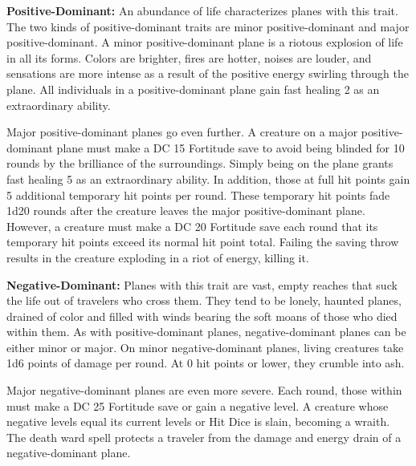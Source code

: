 \textbf{Positive-Dominant:} An abundance of life characterizes planes with this trait. The two kinds of positive-dominant traits are minor positive-dominant and major positive-dominant. A minor positive-dominant plane is a riotous explosion of life in all its forms. Colors are brighter, fires are hotter, noises are louder, and sensations are more intense as a result of the positive energy swirling through the plane. All individuals in a positive-dominant plane gain fast healing 2 as an extraordinary ability.

Major positive-dominant planes go even further. A creature on a major positive-dominant plane must make a DC 15 Fortitude save to avoid being blinded for 10 rounds by the brilliance of the surroundings. Simply being on the plane grants fast healing 5 as an extraordinary ability. In addition, those at full hit points gain 5 additional temporary hit points per round. These temporary hit points fade 1d20 rounds after the creature leaves the major positive-dominant plane. However, a creature must make a DC 20 Fortitude save each round that its temporary hit points exceed its normal hit point total. Failing the saving throw results in the creature exploding in a riot of energy, killing it.

\textbf{Negative-Dominant:} Planes with this trait are vast, empty reaches that suck the life out of travelers who cross them. They tend to be lonely, haunted planes, drained of color and filled with winds bearing the soft moans of those who died within them. As with positive-dominant planes, negative-dominant planes can be either minor or major. On minor negative-dominant planes, living creatures take 1d6 points of damage per round. At 0 hit points or lower, they crumble into ash.

Major negative-dominant planes are even more severe. Each round, those within must make a DC 25 Fortitude save or gain a negative level. A creature whose negative levels equal its current levels or Hit Dice is slain, becoming a wraith. The death ward spell protects a traveler from the damage and energy drain of a negative-dominant plane.